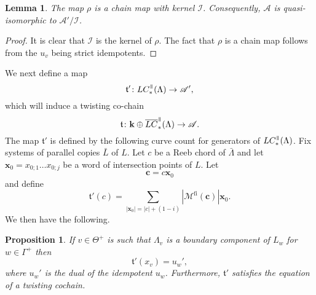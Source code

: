 \documentclass{gtpart}
\newtheorem{lem}[thm]{Lemma}
\newtheorem{prop}[thm]{Proposition}
\renewcommand{\k}{\mathbf{k}}
\renewcommand{\t}{\mathfrak{t}}
\newcommand{\A}{\mathscr{A}}
\renewcommand{\Bar}{\mathrm{B}}
\newcommand{\fl}{\mathrm{fi}}
\renewcommand{\parallel}{{\mkern3mu\vphantom{\perp}\vrule depth 0pt\mkern2mu\vrule depth
0pt\mkern3mu}}
\begin{document}
\begin{lem}
The map $\rho$ is a chain map with kernel $\mathscr{I}$. Consequently, $\A$ is quasi-isomorphic to $\A'/\mathscr{I}$. 
\end{lem}

\begin{proof}
It is clear that $\mathscr{I}$ is the kernel of $\rho$. The fact that $\rho$ is a chain map follows from the $u_{v}$ being strict idempotents.
\end{proof}


We next define a map
\[ 
\t'\colon LC_*^{\parallel}(\Lambda) \to \A', 
\]
which will induce a twisting co-chain
\[ 
\t\colon \k\oplus \overline{LC}_{\ast}^{\parallel}(\Lambda)\to\A.
\]
The map $\t'$ is defined by the following curve count for generators of $LC_{\ast}^{\parallel}(\Lambda)$.
Fix systems of parallel copies $\bar L$ of $L$. Let $c$ be a Reeb chord of $\bar{\Lambda}$ and let $\mathbf{x}_{0}=x_{0;1}\dots x_{0;j}$ be a word of intersection points of $L$. Let 
\[ 
\mathbf{c}=c\mathbf{x}_{0}
\]
and define
\begin{equation}\label{eq:deft'}
\t'(c)=\sum_{|\mathbf{x}_{0}|=|c|+(1-i)}
|\mathcal{M}^{\fl}(\mathbf{c})|\mathbf{x}_{0}.
\end{equation}
We then have the following.

\begin{prop}\label{twch}
If $v\in\Theta^{+}$ is such that $\Lambda_{v}$ is a boundary component of $L_{w}$ for $w\in\Gamma^{+}$ then
\[ 
\t'(x_{v})= u_{w}',
\] 
where $u_{w}'$ is the dual of the idempotent $u_{w}$. Furthermore,
$\t'$ satisfies the equation of a twisting cochain. 
\end{prop} 
\end{document}
